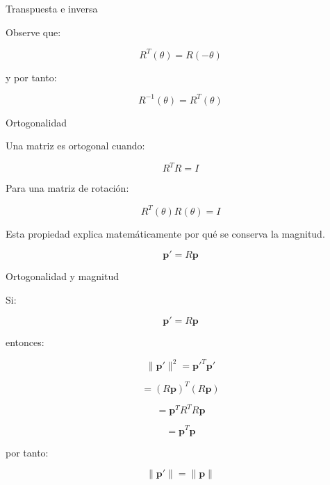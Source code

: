 \documentclass[aspectratio=169]{beamer}
\begin{document}
\begin{frame}{Transpuesta e inversa}

    Observe que:

    \[
    R^T(\theta)=R(-\theta)
    \]

    y por tanto:

    \[
    \boxed{
        R^{-1}(\theta)=R^T(\theta)
    }
    \]

    \vspace{0.4cm}


\end{frame}

\begin{frame}{Ortogonalidad}

    Una matriz es ortogonal cuando:

    \[
    R^TR=I
    \]

    Para una matriz de rotación:

    \[
    R^T(\theta)R(\theta)
    =
    I
    \]

    Esta propiedad explica matemáticamente por qué se conserva la magnitud.

    \[
    \mathbf{p}'=R\mathbf{p}
    \]

\end{frame}

\begin{frame}{Ortogonalidad y magnitud}

    Si:

    \[
    \mathbf{p}'=R\mathbf{p}
    \]

    entonces:

    \[
    \|\mathbf{p}'\|^2
    =
    \mathbf{p}'^T\mathbf{p}'
    \]

    \[
    =
    (R\mathbf{p})^T(R\mathbf{p})
    \]

    \[
    =
    \mathbf{p}^TR^TR\mathbf{p}
    \]

    \[
    =
    \mathbf{p}^T\mathbf{p}
    \]

    por tanto:

    \[
    \boxed{\|\mathbf{p}'\|=\|\mathbf{p}\|}
    \]

\end{frame}
\end{document}
